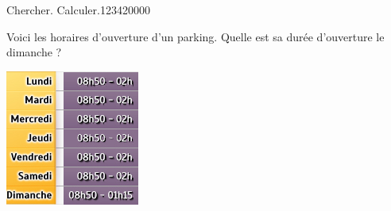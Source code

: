 \begin{pageAD}
  


\begin{ExoCad}{Chercher. Calculer.}{1234}{2}{0}{0}{0}{0}

\begin{minipage}{0.70\linewidth}
Voici les horaires d'ouverture d'un parking. Quelle est sa durée d'ouverture le dimanche ? 
\end{minipage}
\begin{minipage}{0.30\linewidth}
 
 \begin{center}
 \includegraphics[scale=0.7]{FIG/grandeurs_mesures/horaires_parking.jpg} 
 \end{center}
\end{minipage}

\end{ExoCad}

\end{pageAD}

